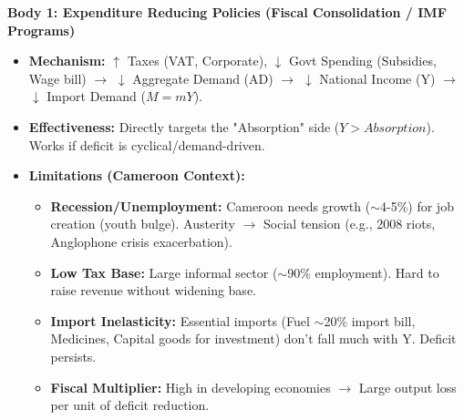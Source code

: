 \documentclass[11pt]{article}
\begin{document}
\begin{exoresolu}
\textbf{Body 1: Expenditure Reducing Policies (Fiscal Consolidation / IMF Programs)}
\begin{itemize}
    \item \textbf{Mechanism:} $\uparrow$ Taxes (VAT, Corporate), $\downarrow$ Govt Spending (Subsidies, Wage bill) $\rightarrow$ $\downarrow$ Aggregate Demand (AD) $\rightarrow$ $\downarrow$ National Income (Y) $\rightarrow$ $\downarrow$ Import Demand ($M = mY$).
    \item \textbf{Effectiveness:} Directly targets the "Absorption" side ($Y > Absorption$). Works if deficit is cyclical/demand-driven.
    \item \textbf{Limitations (Cameroon Context):}
        \begin{itemize}
            \item \textbf{Recession/Unemployment:} Cameroon needs growth ($\sim$4-5\%) for job creation (youth bulge). Austerity $\rightarrow$ Social tension (e.g., 2008 riots, Anglophone crisis exacerbation).
            \item \textbf{Low Tax Base:} Large informal sector ($\sim$90\% employment). Hard to raise revenue without widening base.
            \item \textbf{Import Inelasticity:} Essential imports (Fuel $\sim$20\% import bill, Medicines, Capital goods for investment) don't fall much with Y. Deficit persists.
            \item \textbf{Fiscal Multiplier:} High in developing economies $\rightarrow$ Large output loss per unit of deficit reduction.
        \end{itemize}
\end{itemize}


\end{exoresolu}
\end{document}
